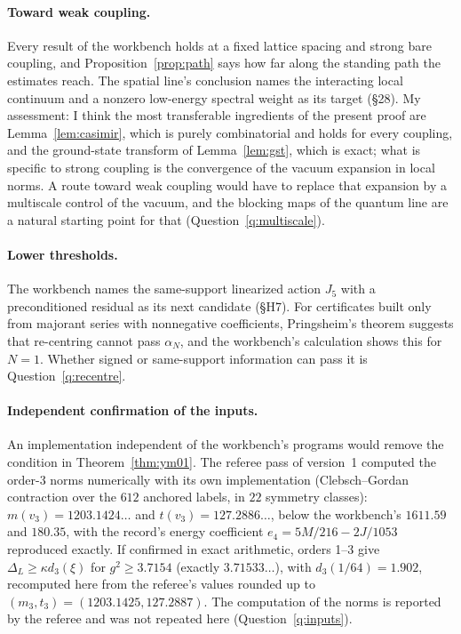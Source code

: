 \paragraph{Toward weak coupling.}
Every result of the workbench holds at a fixed lattice spacing and strong bare coupling, and Proposition~\ref{prop:path} says how far along the standing path the estimates reach. The spatial line's conclusion names the interacting local continuum and a nonzero low-energy spectral weight as its target (§28).
My assessment: I think the most transferable ingredients of the present proof are Lemma~\ref{lem:casimir}, which is purely combinatorial and holds for every coupling, and the ground-state transform of Lemma~\ref{lem:gst}, which is exact; what is specific to strong coupling is the convergence of the vacuum expansion in local norms. A route toward weak coupling would have to replace that expansion by a multiscale control of the vacuum, and the blocking maps of the quantum line are a natural starting point for that (Question~\ref{q:multiscale}).

\paragraph{Lower thresholds.}
The workbench names the same-support linearized action $J_5$ with a preconditioned residual as its next candidate (§H7). For certificates built only from majorant series with nonnegative coefficients, Pringsheim's theorem suggests that re-centring cannot pass $\alpha_N$, and the workbench's calculation shows this for $N=1$. Whether signed or same-support information can pass it is Question~\ref{q:recentre}.

\paragraph{Independent confirmation of the inputs.}
An implementation independent of the workbench's programs would remove the condition in Theorem~\ref{thm:ym01}. The referee pass of version~1 computed the order-3 norms numerically with its own implementation (Clebsch--Gordan contraction over the $612$ anchored labels, in $22$ symmetry classes): $m(v_3)=1203.1424\ldots$ and $t(v_3)=127.2886\ldots$, below the workbench's $1611.59$ and $180.35$, with the record's energy coefficient $e_4=5M/216-2J/1053$ reproduced exactly. If confirmed in exact arithmetic, orders 1--3 give $\Delta_L\ge\kappa d_3(\xi)$ for $g^2\ge3.7154$ (exactly $3.71533\ldots$), with $d_3(1/64)=1.902$, recomputed here from the referee's values rounded up to $(m_3,t_3)=(1203.1425,127.2887)$. The computation of the norms is reported by the referee and was not repeated here (Question~\ref{q:inputs}).

